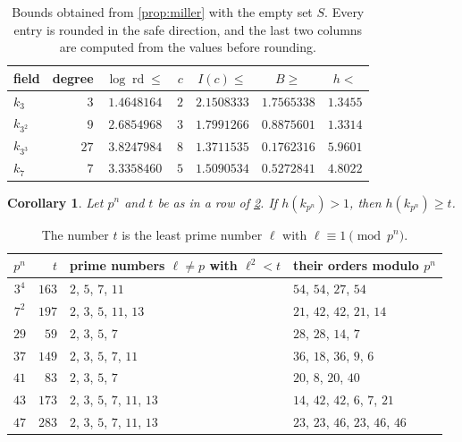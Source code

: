 \documentclass[11pt]{amsart}
\theoremstyle{plain}
\newtheorem{corollary}[theorem]{Corollary}
\theoremstyle{definition}
\begin{document}
\begin{table}[h]
\centering
\begin{tabular}{lrcrccc}
\toprule
field & degree & $\log \operatorname{rd} \le$ & $c$ & $I(c) \le$ & $B \ge$ & $h <$ \\
\midrule
$k_3$ & $3$ & $1.4648164$ & $2$ & $2.1508333$ & $1.7565338$ & $1.3455$ \\
$k_{3^2}$ & $9$ & $2.6854968$ & $3$ & $1.7991266$ & $0.8875601$ & $1.3314$ \\
$k_{3^3}$ & $27$ & $3.8247984$ & $8$ & $1.3711535$ & $0.1762316$ & $5.9601$ \\
$k_7$ & $7$ & $3.3358460$ & $5$ & $1.5090534$ & $0.5272841$ & $4.8022$ \\
\bottomrule
\end{tabular}
\caption{Bounds obtained from \cref{prop:miller} with the empty set $S$. Every entry is rounded in the safe direction, and the last two columns are computed from the values before rounding.}
\label{tab:sub}
\end{table}

\begin{corollary} \label{cor:threshold}
Let $p^n$ and $t$ be as in a row of \cref{tab:threshold}.
If $h(k_{p^n}) > 1$, then $h(k_{p^n}) \ge t$.
\end{corollary}

\begin{table}[h]
\centering
\begin{tabular}{crll}
\toprule
$p^n$ & $t$ & prime numbers $\ell \ne p$ with $\ell^2 < t$ & their orders modulo $p^n$ \\
\midrule
$3^4$ & $163$ & $2$, $5$, $7$, $11$ & $54$, $54$, $27$, $54$ \\
$7^2$ & $197$ & $2$, $3$, $5$, $11$, $13$ & $21$, $42$, $42$, $21$, $14$ \\
$29$ & $59$ & $2$, $3$, $5$, $7$ & $28$, $28$, $14$, $7$ \\
$37$ & $149$ & $2$, $3$, $5$, $7$, $11$ & $36$, $18$, $36$, $9$, $6$ \\
$41$ & $83$ & $2$, $3$, $5$, $7$ & $20$, $8$, $20$, $40$ \\
$43$ & $173$ & $2$, $3$, $5$, $7$, $11$, $13$ & $14$, $42$, $42$, $6$, $7$, $21$ \\
$47$ & $283$ & $2$, $3$, $5$, $7$, $11$, $13$ & $23$, $23$, $46$, $23$, $46$, $46$ \\
\bottomrule
\end{tabular}
\caption{The number $t$ is the least prime number $\ell$ with $\ell \equiv 1 \pmod{p^n}$.}
\label{tab:threshold}
\end{table}
\end{document}
